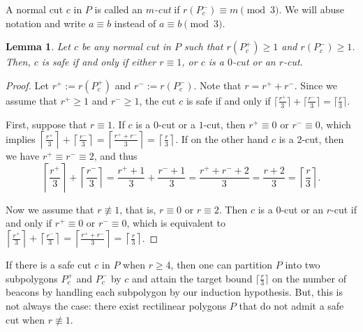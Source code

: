 \documentclass[11pt]{article}
\newtheorem{lemma}{Lemma}
\theoremstyle{definition}
\let\geq\geqslant
\begin{document}
A normal cut $c$ in $P$ is called an \emph{$m$-cut} if $r(P^-_c) \equiv m \pmod 3$.
We will abuse notation and write $a \equiv b$ instead of $a \equiv b \pmod 3$.
\begin{lemma} \label{lem:safe_cut}
 Let $c$ be any normal cut in $P$ such that $r(P^+_c) \geq 1$ and $r(P^-_c) \geq 1$.
 Then, $c$ is safe if and only if either $r \equiv 1$, or
 $c$ is a $0$-cut or an $r$-cut.
\end{lemma}
\begin{proof}
Let $r^+ := r(P^+_c)$ and $r^- := r(P^-_c)$.
Note that $r = r^+ + r^-$.
Since we assume that $r^+ \geq 1$ and $r^- \geq 1$,
the cut $c$ is safe if and only if
$\lceil \frac{r^+}{3} \rceil + \lceil \frac{r^-}{3} \rceil = \lceil \frac{r}{3} \rceil$.


First, suppose that $r \equiv 1$.
If $c$ is  a $0$-cut or a $1$-cut, 
then $r^+ \equiv 0$ or $r^- \equiv 0$, which implies 
$ \left\lceil \frac{r^+}{3} \right\rceil + \left\lceil \frac{r^-}{3} 
\right\rceil  = \left\lceil \frac{r^+ + r^-}{3} \right\rceil    
= \left\lceil \frac{r}{3}\right\rceil$.
If on the other  hand $c$ is a $2$-cut, then we have $r^+ \equiv r^- \equiv 2$, and
thus
\[ \left\lceil \frac{r^+}{3} \right\rceil + \left\lceil \frac{r^-}{3} \right\rceil = \frac{r^+ + 1}{3} + \frac{r^- + 1}{3}
   = \frac{r^+ + r^- + 2}{3} = \frac{r+2}{3} = \left\lceil \frac{r}{3} \right\rceil.\]

Now we assume that $r \not\equiv 1$, that is, $r \equiv 0$ or $r \equiv 2$.
Then $c$ is a $0$-cut or an $r$-cut if and only if  $r^+ \equiv 0$ or $r^- \equiv 0$, which 
is equivalent to 
$ \left\lceil \frac{r^+}{3} \right\rceil + \left\lceil \frac{r^-}{3} \right\rceil  = \left\lceil \frac{r^+ + r^-}{3}
 \right\rceil    = \left\lceil \frac{r}{3}\right\rceil$.
\end{proof}

If there is a safe cut $c$ in $P$ when $r \geq 4$,
then one can partition $P$ into two subpolygons $P^+_c$ and $P^-_c$ by $c$
and attain the target bound $\lceil \frac{r}{3}\rceil$ on the number of beacons
by handling each subpolygon by our induction hypothesis.
But, this is not always the case:
there exist rectilinear polygons $P$ that do not admit a safe cut
when $r \not\equiv 1$.
\end{document}
